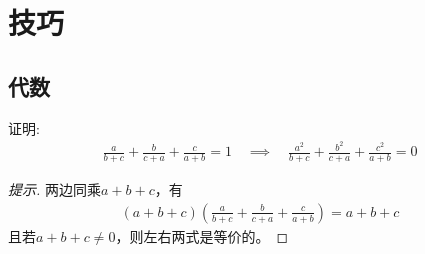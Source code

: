 
\chapter{技巧}
\label{chap:tricks}

\section{代数}
\label{tricks-of-algebra}

\begin{example}
  证明:
  \begin{align*}
    \frac{a}{b+c} + \frac{b}{c+a} + \frac{c}{a+b} = 1 \quad \implies\quad
    \frac{a^2}{b+c} + \frac{b^2}{c+a} + \frac{c^2}{a+b} = 0
  \end{align*}
\end{example}
\begin{proof}[提示]
  两边同乘$a+b+c$，有
  \begin{align*}
    (a+b+c)\left(\frac{a}{b+c} + \frac{b}{c+a} + \frac{c}{a+b}\right) = a+b+c
  \end{align*}
  且若$a+b+c\ne 0$，则左右两式是等价的。
\end{proof}
